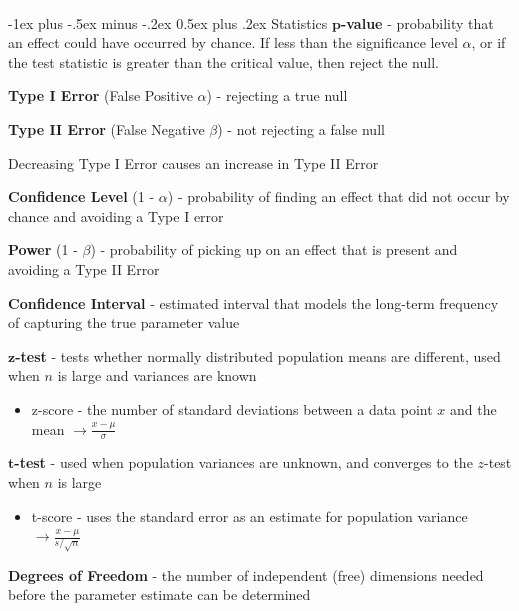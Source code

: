 \documentclass[10pt,landscape]{article}
\makeatletter
\renewcommand{\section}{\@startsection{section}{1}{0mm}%
                                {-1ex plus -.5ex minus -.2ex}%
                                {0.5ex plus .2ex}%
                                {\normalfont\large\bfseries}}
\makeatother
\begin{document}
\begin{multicols}{3}
        \textcolor{white}{.}\vspace{-5mm}\\ %
        \section{Statistics}
    $\boldsymbol p$\textbf{-value} - probability that an effect could have occurred by chance. If less than the significance level $\alpha$, or if the test statistic is greater than the critical value, then reject the null.

        \textbf{Type I Error} (False Positive $\alpha$) - rejecting a true null

        \textbf{Type II  Error} (False Negative $\beta$)  - not rejecting a false null

        Decreasing Type I Error causes an increase in Type II Error

        \textbf{Confidence Level} (1 - $\alpha$) - probability of finding an effect that did not occur by chance and avoiding a Type I error

        \textbf{Power} (1 - $\beta$) - probability of picking up on an effect that is present and avoiding a Type II Error

        \textbf{Confidence Interval} - estimated interval that models the long-term frequency of capturing the true parameter value

    $\boldsymbol{z}$\textbf{-test} - tests whether normally distributed population means are different, used when $n$ is large and variances are known
        \vspace{-.5mm}
        \begin{itemize}[label={--},leftmargin=4mm]
            \itemsep -.4mm
            \item z-score - the number of standard deviations between a data point $x$ and the mean $\to \frac{x - \mu}{\sigma}$
        \end{itemize}
        \vspace{-.5mm}
    $\boldsymbol{t}$\textbf{-test} - used when population variances are unknown, and converges to the $z$-test when $n$ is large
        \vspace{-.5mm}
        \begin{itemize}[label={--},leftmargin=4mm]
            \itemsep -.4mm
            \item t-score - uses the standard error as an estimate for population variance $\to \frac{x - \mu}{s/\sqrt{n}}$
        \end{itemize}
        \vspace{-1mm}
        \textbf{Degrees of Freedom} - the number of independent (free) dimensions needed before the parameter estimate can be determined


\end{multicols}
\end{document}

